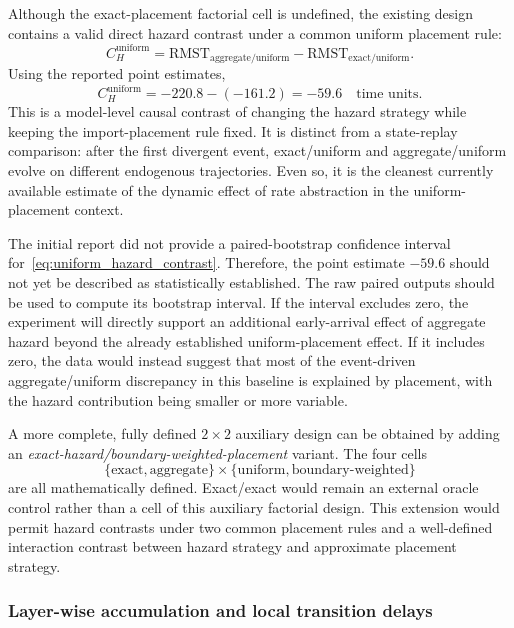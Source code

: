 Although the exact-placement factorial cell is undefined, the existing design contains a valid direct hazard contrast under a common uniform placement rule:
\begin{equation}
    C_H^{\mathrm{uniform}}
    =
    \mathrm{RMST}_{\mathrm{aggregate/uniform}}
    -
    \mathrm{RMST}_{\mathrm{exact/uniform}}.
    \label{eq:uniform_hazard_contrast}
\end{equation}
Using the reported point estimates,
\[
C_H^{\mathrm{uniform}}
=
-220.8-(-161.2)
=
-59.6
\quad\text{time units}.
\]
This is a model-level causal contrast of changing the hazard strategy while keeping the import-placement rule fixed.  It is distinct from a state-replay comparison: after the first divergent event, exact/uniform and aggregate/uniform evolve on different endogenous trajectories.  Even so, it is the cleanest currently available estimate of the dynamic effect of rate abstraction in the uniform-placement context.

The initial report did not provide a paired-bootstrap confidence interval for~\eqref{eq:uniform_hazard_contrast}.  Therefore, the point estimate $-59.6$ should not yet be described as statistically established.  The raw paired outputs should be used to compute its bootstrap interval.  If the interval excludes zero, the experiment will directly support an additional early-arrival effect of aggregate hazard beyond the already established uniform-placement effect.  If it includes zero, the data would instead suggest that most of the event-driven aggregate/uniform discrepancy in this baseline is explained by placement, with the hazard contribution being smaller or more variable.

A more complete, fully defined $2\times2$ auxiliary design can be obtained by adding an \emph{exact-hazard/boundary-weighted-placement} variant.  The four cells
\[
\{\text{exact},\text{aggregate}\}
\times
\{\text{uniform},\text{boundary-weighted}\}
\]
are all mathematically defined.  Exact/exact would remain an external oracle control rather than a cell of this auxiliary factorial design.  This extension would permit hazard contrasts under two common placement rules and a well-defined interaction contrast between hazard strategy and approximate placement strategy.

\subsubsection{Layer-wise accumulation and local transition delays}
\label{sec:hazard_placement_layerwise}

